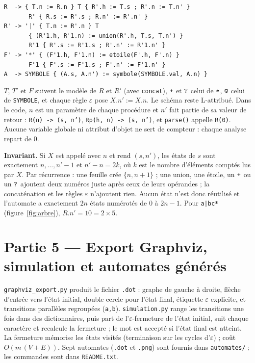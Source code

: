 \documentclass[12pt,a4paper]{article}
\newcommand{\code}[1]{{\fontsize{10}{12}\selectfont\texttt{#1}}}
\newcommand{\eps}{\ensuremath{\varepsilon}}
\newcommand{\tok}[1]{\ensuremath{\text{\fontsize{10}{12}\selectfont\ttfamily #1}}}
\begin{document}
\noindent\begin{minipage}{\linewidth}
\begin{lstlisting}[style=schema]
R  -> { T.n := R.n } T { R'.h := T.s ; R'.n := T.n' }
       R' { R.s := R'.s ; R.n' := R'.n' }
R' -> '|' { T.n := R'.n } T
       { (R'1.h, R'1.n) := union(R'.h, T.s, T.n') }
       R'1 { R'.s := R'1.s ; R'.n' := R'1.n' }
F' -> '*' { (F'1.h, F'1.n) := etoile(F'.h, F'.n) }
       F'1 { F'.s := F'1.s ; F'.n' := F'1.n' }
A  -> SYMBOLE { (A.s, A.n') := symbole(SYMBOLE.val, A.n) }
\end{lstlisting}
\end{minipage}

$T$, $T'$ et $F$ suivent le modèle de $R$ et $R'$ (avec \code{concat}), \tok{+} et \tok{?} celui de
\tok{*}, \tok{@} celui de \code{SYMBOLE}, et chaque règle \eps{} pose $X.n' := X.n$. Le schéma
reste L-attribué. Dans le code, $n$ est un paramètre de chaque procédure et $n'$ fait partie de sa
valeur de retour : \code{R(n) -> (s, n')}, \code{Rp(h, n) -> (s, n')}, et \code{parse()} appelle
\code{R(0)}. Aucune variable globale ni attribut d'objet ne sert de compteur : chaque analyse repart
de 0.

\textbf{Invariant.} Si $X$ est appelé avec $n$ et rend $(s, n')$, les états de $s$ sont
exactement $n, \dots, n'-1$ et $n' - n = 2k$, où $k$ est le nombre d'éléments comptés lus par
$X$. Par récurrence : une feuille crée $\{n, n+1\}$ ; une union, une étoile, un \tok{+} ou un
\tok{?} ajoutent deux numéros juste après ceux de leurs opérandes ; la concaténation et les règles
\eps{} n'ajoutent rien. Aucun état n'est donc réutilisé et l'automate a exactement $2n$ états
numérotés de 0 à $2n-1$. Pour \code{a|bc*} (figure~\ref{fig:arbre}), $R.n' = 10 = 2 \times 5$.

\section{Partie 5 --- Export Graphviz, simulation et automates générés}\label{sec:partie5}

\code{graphviz\_export.py} produit le fichier \code{.dot} : graphe de gauche à droite, flèche
d'entrée vers l'état initial, double cercle pour l'état final, étiquette \eps{} explicite, et
transitions parallèles regroupées (\code{a,b}). \code{simulation.py} range les transitions une fois
dans des dictionnaires, puis part de l'\eps-fermeture de l'état initial, suit chaque caractère et
recalcule la fermeture ; le mot est accepté si l'état final est atteint. La fermeture mémorise les
états visités (terminaison sur les cycles d'\eps{}) ; coût $O(m\,(V+E))$. Sept automates (\code{.dot} et \code{.png}) sont fournis dans
\code{automates/} ; les commandes sont dans \code{README.txt}.
\end{document}
